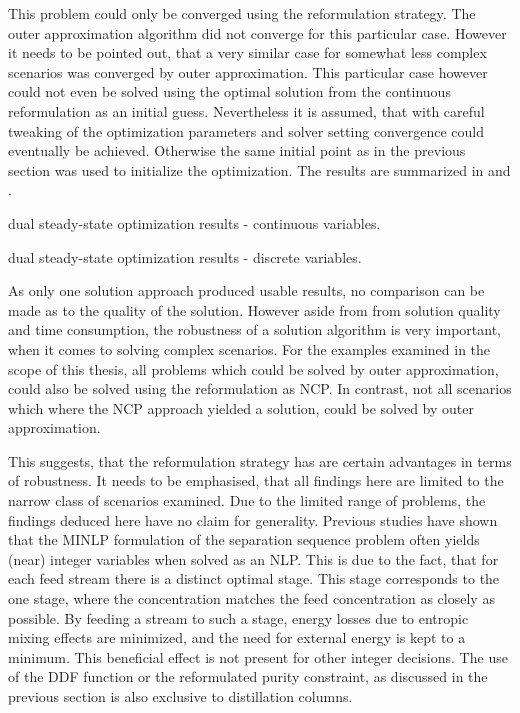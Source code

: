         This problem could only be converged using the reformulation strategy. The outer approximation algorithm
        did not converge for this particular case. However it needs to be pointed out, that a very similar case
        for somewhat less complex scenarios was converged by outer approximation. This particular case however could
        not even be solved using the optimal solution from the continuous reformulation as an initial guess.
        Nevertheless it is assumed, that with careful tweaking of the optimization parameters and solver setting
        convergence could eventually be achieved.
        Otherwise the same initial point as in the previous section was used to initialize the optimization.
        The results are summarized in  and .
        \begin{table}
            \center
            \footnotesize
            
            \caption{dual steady-state optimization results - continuous variables.}
            \label{tab:ss_result_dual_cont}
        \end{table}
        \begin{table}
            \center
            \footnotesize
            
            \caption{dual steady-state optimization results - discrete variables.}
            \label{tab:ss_result_dual_disc}
        \end{table}

        As only one solution approach produced usable results, no comparison can be made as to the quality of the
        solution. However aside from from solution quality and time consumption, the robustness of a solution algorithm
        is very important, when it comes to solving complex scenarios. For the examples examined in the scope of this thesis,
        all problems which could be solved by outer approximation, could also be solved using the reformulation as NCP.
        In contrast, not all scenarios which where the NCP approach yielded a solution, could be solved by outer approximation.

        This suggests, that the reformulation strategy has are certain advantages in terms of robustness. It needs to be emphasised,
        that all findings here are limited to the narrow class of scenarios examined. Due to the limited range of problems, the findings
        deduced here have no claim for generality. Previous studies have shown \cite{Grossmann.2005} that the MINLP formulation
        of the separation sequence problem often yields (near) integer variables when solved as an NLP. This is due to the fact,
        that for each feed stream there is a distinct optimal stage. This stage corresponds to the one stage, where the concentration
        matches the feed concentration as closely as possible. By feeding a stream to such a stage, energy losses due to
        entropic mixing effects are minimized, and the need for external energy is kept to a minimum. This beneficial effect
        is not present for other integer decisions. The use of the DDF function or the reformulated purity constraint, as discussed
        in the previous section is also exclusive to distillation columns.

